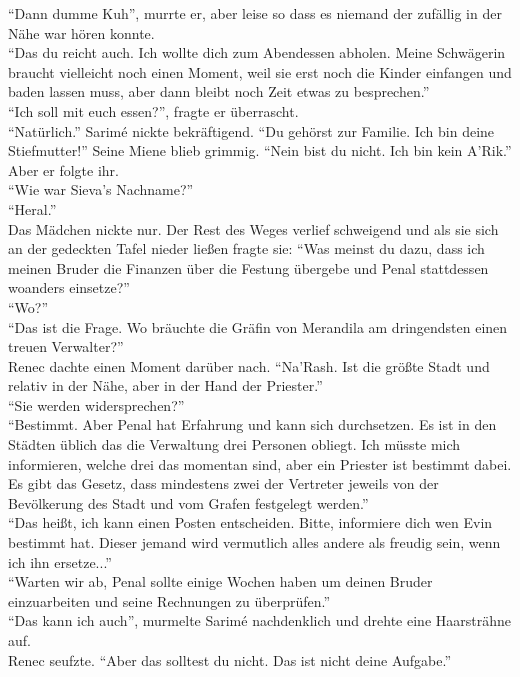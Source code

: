 ``Dann dumme Kuh'', murrte er, aber leise so dass es niemand der zufällig in der Nähe war hören 
konnte.\\
``Das du reicht auch. Ich wollte dich zum Abendessen abholen. Meine Schwägerin braucht vielleicht 
noch einen Moment, weil sie erst noch die Kinder einfangen und baden lassen muss, aber dann bleibt 
noch Zeit etwas zu besprechen.''\\
``Ich soll mit euch essen?'', fragte er überrascht.\\
``Natürlich.'' Sarimé nickte bekräftigend. ``Du gehörst zur Familie. Ich bin deine Stiefmutter!''
Seine Miene blieb grimmig. ``Nein bist du nicht. Ich bin kein A'Rik.''\\
Aber er folgte ihr.\\
``Wie war Sieva's Nachname?''\\
``Heral.''\\
Das Mädchen nickte nur. Der Rest des Weges verlief schweigend und als sie sich an der gedeckten 
Tafel nieder ließen fragte sie: ``Was meinst du dazu, dass ich meinen Bruder die Finanzen über die 
Festung übergebe und Penal stattdessen woanders einsetze?''\\
``Wo?''\\
``Das ist die Frage. Wo bräuchte die Gräfin von Merandila am dringendsten einen treuen 
Verwalter?''\\
Renec dachte einen Moment darüber nach. ``Na'Rash. Ist die größte Stadt und relativ in der Nähe, 
aber 
in der Hand der Priester.''\\
``Sie werden widersprechen?'' \\
``Bestimmt. Aber Penal hat Erfahrung und kann sich durchsetzen. Es ist in den Städten üblich das 
die 
Verwaltung drei Personen obliegt. Ich müsste mich informieren, welche drei das momentan sind, aber 
ein Priester ist bestimmt dabei. Es gibt das Gesetz, dass mindestens zwei der Vertreter jeweils von 
der Bevölkerung des Stadt und vom Grafen festgelegt werden.''\\
``Das heißt, ich kann einen Posten entscheiden. Bitte, informiere dich wen Evin bestimmt hat. 
Dieser 
jemand wird vermutlich alles andere als freudig sein, wenn ich ihn ersetze...''\\
``Warten wir ab, Penal sollte einige Wochen haben um deinen Bruder einzuarbeiten und seine 
Rechnungen 
zu überprüfen.''\\
``Das kann ich auch'', murmelte Sarimé nachdenklich und drehte eine Haarsträhne auf.\\
Renec seufzte. ``Aber das solltest du nicht. Das ist nicht deine Aufgabe.''\\
